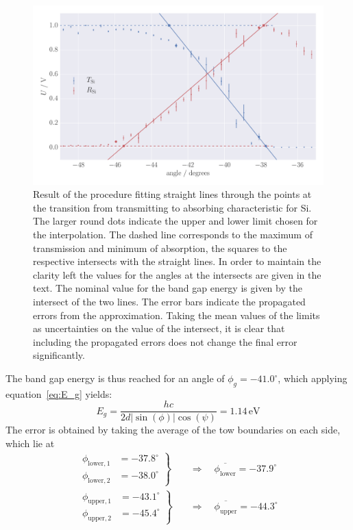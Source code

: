 \begin{figure}
    \centering
    \includegraphics[width=1.0\linewidth]{figures/band_gap_result_error}
    \caption{
        Result of the procedure fitting straight lines through the points 
        at the transition from transmitting to absorbing characteristic for Si. 
        The larger round dots indicate the upper and lower limit 
        chosen for the interpolation. The dashed line corresponds to 
        the maximum of transmission and minimum of absorption, the 
        squares to the respective intersects with the straight lines.
        In order to maintain the clarity left
        the values for the angles at the intersects are given in the text. 
        The nominal value for the band gap energy is given by the intersect 
        of the two lines.
        The error bars indicate the propagated errors from the approximation. 
        Taking the mean values of the limits as uncertainties on the 
        value of the intersect, it is clear that including the propagated errors 
        does not change the final error significantly. 
        }
    \label{fig:band_gap_result_Si_left}
\end{figure}
The band gap energy is thus reached for an angle of $\phi_g = -41.0^\circ$, 
which applying equation~\eqref{eq:E_g} yields:
\begin{equation}
    E_g = \frac{h c}{2d |\sin(\phi)| \cos(\psi)} = 1.14\, \mathrm{eV}
\end{equation}
The error is obtained by taking the average of the tow boundaries on each side, 
which lie at 
\begin{align}
    \left.
    \begin{aligned}
        \phi_\mathrm{lower, 1} &= -37.8^\circ \\
        \phi_\mathrm{lower, 2} &= -38.0^\circ
    \end{aligned}
    \right\} \quad &\Rightarrow \quad
    \overline{\phi_\mathrm{lower}} = -37.9^\circ \\
    \left.
    \begin{aligned}
    \phi_\mathrm{upper, 1} &= -43.1^\circ \\
    \phi_\mathrm{upper, 2} &= -45.4^\circ
    \end{aligned}
    \right\} \quad &\Rightarrow \quad
    \overline{\phi_\mathrm{upper}} = -44.3^\circ \\
\end{align}
